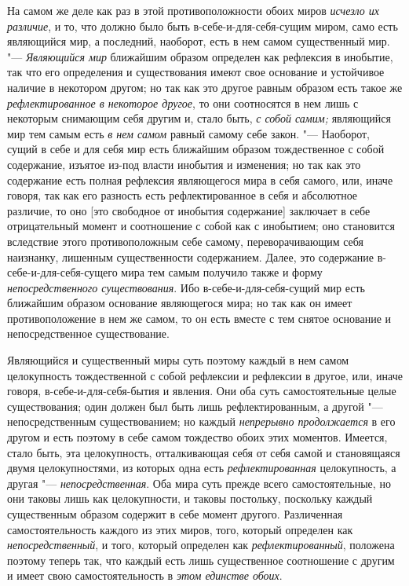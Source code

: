На самом же деле как раз в этой противоположности обоих миров
{\em исчезло их различие}, и то, что должно было быть
в-себе-и-для-себя-сущим миром, само есть являющийся мир, а последний,
наоборот, есть в нем самом существенный мир. "---
{\em Являющийся мир} ближайшим образом определен как
рефлексия в инобытие, так что его определения и существования имеют свое
основание и устойчивое наличие в некотором другом; но так как это другое
равным образом есть такое же {\em рефлектированное в
некоторое другое}, то они соотносятся в нем лишь с некоторым снимающим себя
другим и, стало быть, {\em с собой самим;} являющийся
мир тем самым есть {\em в нем самом} равный самому себе
закон. "--- Наоборот, сущий в себе и для себя мир есть ближайшим образом
тождественное с собой содержание, изъятое из-под власти инобытия и
изменения; но так как это содержание есть полная рефлексия являющегося мира
в себя самого, или, иначе говоря, так как его разность есть
рефлектированное в себя и абсолютное различие, то оно [это свободное от
инобытия содержание] заключает в себе отрицательный момент и соотношение с
собой как с инобытием; оно становится вследствие этого противоположным себе
самому, переворачивающим себя наизнанку, лишенным существенности
содержанием. Далее, это содержание в-себе-и-для-себя-сущего мира тем самым
получило также и форму {\em непосредственного
существования}. Ибо в-себе-и-для-себя-сущий мир есть ближайшим образом
основание являющегося мира; но так как он имеет противоположение в нем же
самом, то он есть вместе с тем снятое основание и непосредственное
существование.

Являющийся и существенный миры суть поэтому каждый в нем самом целокупность
тождественной с собой рефлексии и рефлексии в другое, или, иначе говоря,
в-себе-и-для-себя-бытия и явления. Они оба суть самостоятельные целые
существования; один должен был быть лишь рефлектированным, а другой
"--- непосредственным существованием; но каждый
{\em непрерывно продолжается} в его другом и есть
поэтому в себе самом тождество обоих этих моментов. Имеется, стало быть,
эта целокупность, отталкивающая себя от себя самой и становящаяся двумя
целокупностями, из которых одна есть
{\em рефлектированная} целокупность, а другая
"--- {\em непосредственная}. Оба мира суть прежде всего
самостоятельные, но они таковы лишь как целокупности, и таковы постольку,
поскольку каждый существенным образом содержит в себе момент другого.
Различенная самостоятельность каждого из этих миров, того, который
определен как {\em непосредственный}, и того, который
определен как {\em рефлектированный}, положена поэтому
теперь так, что каждый есть лишь существенное соотношение с другим и имеет
свою самостоятельность в {\em этом единстве обоих}.

